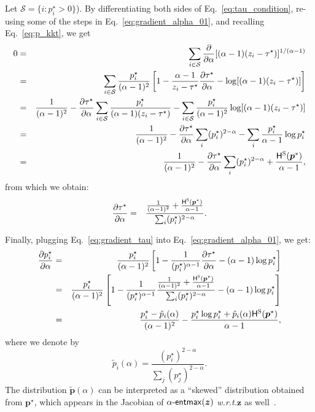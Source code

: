 \documentclass[11pt,a4paper]{article}
\makeatletter
\newcommand*{\wrt}{\textit{w.\hspace{.07em}r\hspace{.07em}.t.}\@\xspace}
\newcommand\pp{p}
\newcommand\xx{z}
\newcommand\x{\bm{\xx}}
\newcommand{\HHs}{\mathsf{H}^\textsc{S}}
\newcommand*\entmaxtext{entmax\xspace}
\newcommand*\aentmax[1][\alpha]{\mathop{\mathsf{#1}\textnormal{-}\mathsf{\entmaxtext}}}
\makeatother
\begin{document}
Let $\mathcal{S} = \{i: \pp^\star_i > 0 \}$).
By differentiating both sides of Eq.~\ref{eq:tau_condition}, re-using some of
the steps in Eq.~\ref{eq:gradient_alpha_01}, and recalling Eq.~\ref{eq:p_kkt},
we get
\begin{eqnarray}\label{eq:gradient_tau_implicit}
    0 &=& \sum_{i \in \mathcal{S}} \frac{\partial}{\partial \alpha} [(\alpha-1)(z_i - \tau^{\star})]^{1/(\alpha-1)}\nonumber\\
    &=& \sum_{i \in \mathcal{S}} \frac{p_i^{\star}}{(\alpha-1)^2} \left[1 - \frac{\alpha-1}{z_i - \tau^{\star}}\frac{\partial \tau^{\star}}{\partial \alpha} - \log[(\alpha-1)(z_i - \tau^{\star})] \right]\nonumber\\
    &=&  \frac{1}{(\alpha-1)^2} - \frac{\partial \tau^{\star}}{\partial \alpha} \sum_{i \in \mathcal{S}} \frac{p_i^{\star}}{(\alpha - 1)(z_i - \tau^{\star})} - \sum_{i \in \mathcal{S}} \frac{p_i^{\star}}{(\alpha-1)^2} \log[(\alpha-1)(z_i - \tau^{\star})] \nonumber\\
    &=&  \frac{1}{(\alpha-1)^2} - \frac{\partial \tau^{\star}}{\partial \alpha} \sum_{i} (p_i^{\star})^{2-\alpha} - \sum_{i} \frac{p_i^{\star}}{\alpha-1} \log p_i^{\star}\nonumber\\
    &=&  \frac{1}{(\alpha-1)^2} - \frac{\partial \tau^{\star}}{\partial \alpha} \sum_{i} (p_i^{\star})^{2-\alpha} + \frac{\HHs(\bm{p}^*)}{\alpha-1},
\end{eqnarray}
from which we obtain:
\begin{eqnarray}\label{eq:gradient_tau}
    \frac{\partial \tau^{\star}}{\partial \alpha} &=& \frac{\frac{1}{(\alpha-1)^2} + \frac{\HHs(\bm{p}^{\star})}{\alpha-1}}{\sum_i (p_i^{\star})^{2-\alpha}}.
\end{eqnarray}

Finally, plugging Eq.~\ref{eq:gradient_tau} into Eq.~\ref{eq:gradient_alpha_01}, we get:
\begin{eqnarray}\label{eq:gradient_alpha}
    \frac{\partial p_i^{\star}}{\partial \alpha} &=&  \frac{p_i^{\star}}{(\alpha-1)^2} \left[1 - \frac{1}{(p_i^{\star})^{\alpha-1}}\frac{\partial \tau^{\star}}{\partial \alpha} - (\alpha-1)\log p_i^{\star} \right]\nonumber\\
    &=&  \frac{p_i^{\star}}{(\alpha-1)^2} \left[1 - \frac{1}{(p_i^{\star})^{\alpha-1}}\frac{\frac{1}{(\alpha-1)^2} + \frac{\HHs(\bm{p}^{\star})}{\alpha-1}}{\sum_i (p_i^{\star})^{2-\alpha}} - (\alpha-1)\log p_i^{\star} \right]\nonumber\\
    &=& \frac{p_i^{\star} - \tilde{p}_i(\alpha)}{(\alpha-1)^2} - \frac{p_i^{\star}\log p_i^{\star} + \tilde{p}_i(\alpha)\HHs(\bm{p}^{\star})}{\alpha-1},
\end{eqnarray}
where we denote by
\begin{equation}
    \tilde{p}_i(\alpha) = \frac{(p_i^{\star})^{2-\alpha}}{\sum_j (p_j^{\star})^{2-\alpha}}.
\end{equation}
The distribution $\tilde{\bm{p}}(\alpha)$ can be interpreted as a ``skewed''
distribution obtained from $\bm{p}^{\star}$, which appears in the Jacobian of
$\aentmax(\x)$ \wrt $\x$ as well~\cite{entmax}.
\end{document}
